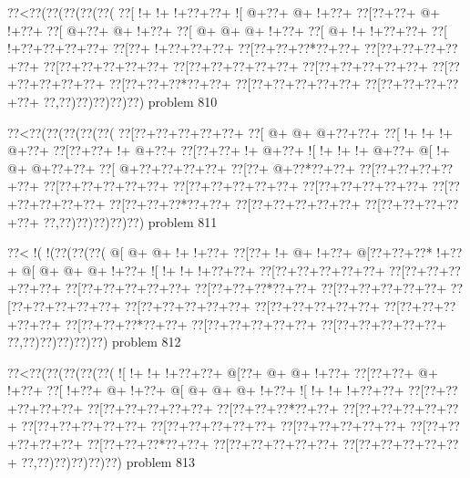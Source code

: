 \vbox{\vbox{\goo
\0??<\0??(\0??(\0??(\0??(\0??(
\0??[\- !+\- !+\- !+\0??+\0??+
\- ![\- @+\0??+\- @+\- !+\0??+
\0??[\0??+\0??+\- @+\- !+\0??+
\0??[\- @+\0??+\- @+\- !+\0??+
\0??[\- @+\- @+\- @+\- !+\0??+
\0??[\- @+\- !+\- !+\0??+\0??+
\0??[\- !+\0??+\0??+\0??+\0??+
\0??[\0??+\- !+\0??+\0??+\0??+
\0??[\0??+\0??+\0??*\0??+\0??+
\0??[\0??+\0??+\0??+\0??+\0??+
\0??[\0??+\0??+\0??+\0??+\0??+
\0??[\0??+\0??+\0??+\0??+\0??+
\0??[\0??+\0??+\0??+\0??+\0??+
\0??[\0??+\0??+\0??+\0??+\0??+
\0??[\0??+\0??+\0??*\0??+\0??+
\0??[\0??+\0??+\0??+\0??+\0??+
\0??[\0??+\0??+\0??+\0??+\0??+
\0??,\0??)\0??)\0??)\0??)\0??)
}
\hfil problem 810\hfil\break
}

\vbox{\vbox{\goo
\0??<\0??(\0??(\0??(\0??(\0??(
\0??[\0??+\0??+\0??+\0??+\0??+
\0??[\- @+\- @+\- @+\0??+\0??+
\0??[\- !+\- !+\- !+\- @+\0??+
\0??[\0??+\0??+\- !+\- @+\0??+
\0??[\0??+\0??+\- !+\- @+\0??+
\- ![\- !+\- !+\- !+\- @+\0??+
\- @[\- !+\- @+\- @+\0??+\0??+
\0??[\- @+\0??+\0??+\0??+\0??+
\0??[\0??+\- @+\0??*\0??+\0??+
\0??[\0??+\0??+\0??+\0??+\0??+
\0??[\0??+\0??+\0??+\0??+\0??+
\0??[\0??+\0??+\0??+\0??+\0??+
\0??[\0??+\0??+\0??+\0??+\0??+
\0??[\0??+\0??+\0??+\0??+\0??+
\0??[\0??+\0??+\0??*\0??+\0??+
\0??[\0??+\0??+\0??+\0??+\0??+
\0??[\0??+\0??+\0??+\0??+\0??+
\0??,\0??)\0??)\0??)\0??)\0??)
}
\hfil problem 811\hfil\break
}

\vbox{\vbox{\goo
\0??<\- !(\- !(\0??(\0??(\0??(
\- @[\- @+\- @+\- !+\- !+\0??+
\0??[\0??+\- !+\- @+\- !+\0??+
\- @[\0??+\0??+\0??*\- !+\0??+
\- @[\- @+\- @+\- @+\- !+\0??+
\- ![\- !+\- !+\- !+\0??+\0??+
\0??[\0??+\0??+\0??+\0??+\0??+
\0??[\0??+\0??+\0??+\0??+\0??+
\0??[\0??+\0??+\0??+\0??+\0??+
\0??[\0??+\0??+\0??*\0??+\0??+
\0??[\0??+\0??+\0??+\0??+\0??+
\0??[\0??+\0??+\0??+\0??+\0??+
\0??[\0??+\0??+\0??+\0??+\0??+
\0??[\0??+\0??+\0??+\0??+\0??+
\0??[\0??+\0??+\0??+\0??+\0??+
\0??[\0??+\0??+\0??*\0??+\0??+
\0??[\0??+\0??+\0??+\0??+\0??+
\0??[\0??+\0??+\0??+\0??+\0??+
\0??,\0??)\0??)\0??)\0??)\0??)
}
\hfil problem 812\hfil\break
}

\vbox{\vbox{\goo
\0??<\0??(\0??(\0??(\0??(\0??(
\- ![\- !+\- !+\- !+\0??+\0??+
\- @[\0??+\- @+\- @+\- !+\0??+
\0??[\0??+\0??+\- @+\- !+\0??+
\0??[\- !+\0??+\- @+\- !+\0??+
\- @[\- @+\- @+\- @+\- !+\0??+
\- ![\- !+\- !+\- !+\0??+\0??+
\0??[\0??+\0??+\0??+\0??+\0??+
\0??[\0??+\0??+\0??+\0??+\0??+
\0??[\0??+\0??+\0??*\0??+\0??+
\0??[\0??+\0??+\0??+\0??+\0??+
\0??[\0??+\0??+\0??+\0??+\0??+
\0??[\0??+\0??+\0??+\0??+\0??+
\0??[\0??+\0??+\0??+\0??+\0??+
\0??[\0??+\0??+\0??+\0??+\0??+
\0??[\0??+\0??+\0??*\0??+\0??+
\0??[\0??+\0??+\0??+\0??+\0??+
\0??[\0??+\0??+\0??+\0??+\0??+
\0??,\0??)\0??)\0??)\0??)\0??)
}
\hfil problem 813\hfil\break
}


